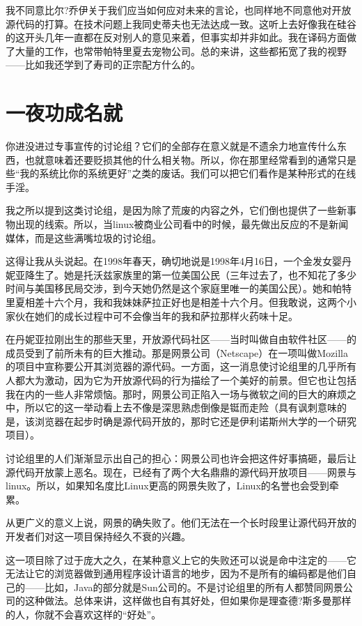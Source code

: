 我不同意比尔?乔伊关于我们应当如何应对未来的言论，也同样地不同意他对开放源代码的打算。在技术问题上我同史蒂夫也无法达成一致。这听上去好像我在硅谷的这开头几年一直都在反对别人的意见来着，但事实却并非如此。我在译码方面做了大量的工作，也常带帕特里夏去宠物公司。总的来讲，这些都拓宽了我的视野——比如我还学到了寿司的正宗配方什么的。

 
\section{一夜功成名就}

你进没进过专事宣传的讨论组？它们的全部存在意义就是不遗余力地宣传什么东西，也就意味着还要贬损其他的什么相关物。所以，你在那里经常看到的通常只是些“我的系统比你的系统更好”之类的废话。我们可以把它们看作是某种形式的在线手淫。

我之所以提到这类讨论组，是因为除了荒废的内容之外，它们倒也提供了一些新事物出现的线索。所以，当linux被商业公司看中的时候，最先做出反应的不是新闻媒体，而是这些满嘴垃圾的讨论组。

这得让我从头说起。在1998年春天，确切地说是1998年4月16日，一个金发女婴丹妮亚降生了。她是托沃兹家族里的第一位美国公民（三年过去了，也不知花了多少时间与美国移民局交涉，到今天她仍然是这个家庭里唯一的美国公民）。她和帕特里夏相差十六个月，我和我妹妹萨拉正好也是相差十六个月。但我敢说，这两个小家伙在她们的成长过程中可不会像当年的我和萨拉那样火药味十足。

在丹妮亚拉刚出生的那些天里，开放源代码社区——当时叫做自由软件社区——的成员受到了前所未有的巨大推动。那是网景公司（Netscape）在一项叫做Mozilla的项目中宣称要公开其浏览器的源代码。一方面，这一消息使讨论组里的几乎所有人都大为激动，因为它为开放源代码的行为描绘了一个美好的前景。但它也让包括我在内的一些人非常烦恼。那时，网景公司正陷入一场与微软之间的巨大的麻烦之中，所以它的这一举动看上去不像是深思熟虑倒像是铤而走险（具有讽刺意味的是，该浏览器在起步时确是源代码开放的，那时它还是伊利诺斯州大学的一个研究项目）。

讨论组里的人们渐渐显示出自己的担心：网景公司也许会把这件好事搞砸，最后让源代码开放蒙上恶名。现在，已经有了两个大名鼎鼎的源代码开放项目——网景与linux。所以，如果知名度比Linux更高的网景失败了，Linux的名誉也会受到牵累。

从更广义的意义上说，网景的确失败了。他们无法在一个长时段里让源代码开放的开发者们对这一项目保持经久不衰的兴趣。

这一项目除了过于庞大之久，在某种意义上它的失败还可以说是命中注定的——它无法让它的浏览器做到通用程序设计语言的地步，因为不是所有的编码都是他们自己的——比如，Java的部分就是Sun公司的。不是讨论组里的所有人都赞同网景公司的这种做法。总体来讲，这样做也自有其好处，但如果你是理查德?斯多曼那样的人，你就不会喜欢这样的“好处”。

